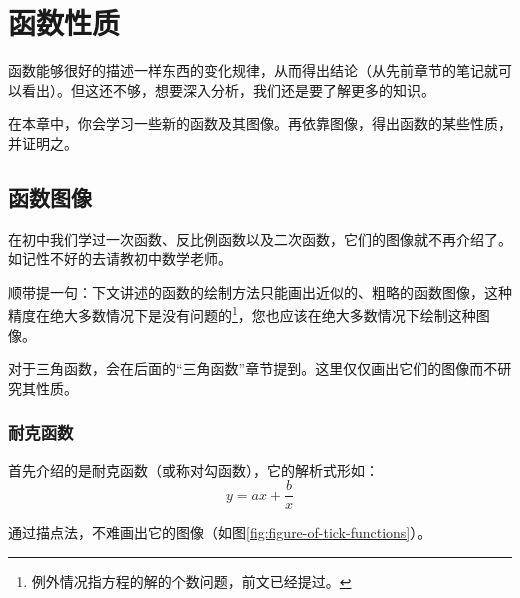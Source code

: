 \chapter{函数性质}
函数能够很好的描述一样东西的变化规律，从而得出结论（从先前章节的笔记就可以看出）。但这还不够，想要深入分析，我们还是要了解更多的知识。

在本章中，你会学习一些新的函数及其图像。再依靠图像，得出函数的某些性质，并证明之。

\section{函数图像}
在初中我们学过一次函数、反比例函数以及二次函数，它们的图像就不再介绍了。如记性不好的去请教初中数学老师。

顺带提一句：下文讲述的函数的绘制方法只能画出近似的、粗略的函数图像，这种精度在绝大多数情况下是没有问题的\footnote{例外情况指方程的解的个数问题，前文已经提过。}，您也应该在绝大多数情况下绘制这种图像。

对于三角函数，会在后面的“三角函数”章节提到。这里仅仅画出它们的图像而不研究其性质。

\subsection{耐克函数}
首先介绍的是耐克函数（或称对勾函数），它的解析式形如：\[y=ax+\frac{b}{x}\]

通过描点法，不难画出它的图像（如图\ref{fig:figure-of-tick-functions}）。

